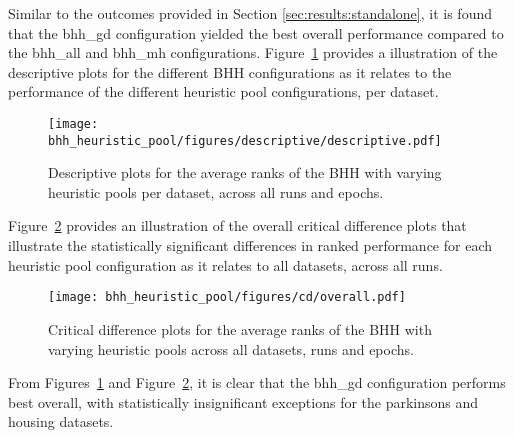 Similar to the outcomes provided in Section \ref{sec:results:standalone}, it is found that the bhh\_gd configuration yielded the best overall performance compared to the bhh\_all and bhh\_mh configurations. Figure~\ref{fig:results:heuristic_pool:descriptive:descriptive} provides a illustration of the descriptive plots for the different \acs{BHH} configurations as it relates to the performance of the different heuristic pool configurations, per dataset.

\begin{figure}[H]
	\centering
	\texttt{[image: bhh\_heuristic\_pool/figures/descriptive/descriptive.pdf]}
	\caption{Descriptive plots for the average ranks of the \acs{BHH} with varying heuristic pools per dataset, across all runs and epochs.}
	\label{fig:results:heuristic_pool:descriptive:descriptive}
\end{figure}

Figure~\ref{fig:results:heuristic_pool:descriptive:cd} provides an illustration of the overall critical difference plots that illustrate the statistically significant differences in ranked performance for each heuristic pool configuration as it relates to all datasets, across all runs.

\begin{figure}[H]
	\centering
	\texttt{[image: bhh\_heuristic\_pool/figures/cd/overall.pdf]}
	\caption{Critical difference plots for the average ranks of the \acs{BHH} with varying heuristic pools across all datasets, runs and epochs.}
	\label{fig:results:heuristic_pool:descriptive:cd}
\end{figure}

From Figures~\ref{fig:results:heuristic_pool:descriptive:descriptive} and Figure~\ref{fig:results:heuristic_pool:descriptive:cd}, it is clear that the bhh\_gd configuration performs best overall, with statistically insignificant exceptions for the parkinsons and housing datasets.

